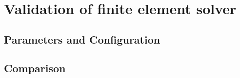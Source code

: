 \chapter{Validation of finite element solver}
\label{chap:validation}

\section{Parameters and Configuration}

\section{Comparison}

